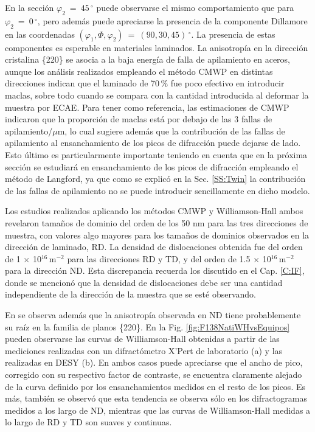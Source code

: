 En la sección $\varphi_2 \ = \ 45$\,$^{\circ}$ puede observarse el mismo comportamiento que para $\varphi_2 \ = \ 0$\,$^{\circ}$, pero además puede apreciarse la presencia de la componente Dillamore en las coordenadas $(\varphi_1, \Phi, \varphi_2) \ = \ (90, 30, 45)$\,$^{\circ}$.
La presencia de estas componentes es esperable en materiales laminados.
La anisotropía en la dirección cristalina \{220\} se asocia a la baja energía de falla de apilamiento en aceros\cite{Sathiaraj2015,Saleh2012}, aunque los análisis realizados empleando el método CMWP en distintas direcciones indican que el laminado de 70\,\% fue poco efectivo en introducir maclas, sobre todo cuando se compara con la cantidad introducida al deformar la muestra por ECAE.
Para tener como referencia, las estimaciones de CMWP indicaron que la proporción de maclas está por debajo de las 3 fallas de apilamiento/$\mu$m, lo cual sugiere además que la contribución de las fallas de apilamiento al ensanchamiento de los picos de difracción puede dejarse de lado.
Esto último es particularmente importante teniendo en cuenta que en la próxima sección se estudiará en ensanchamiento de los picos de difracción empleando el método de Langford, ya que como se explicó en la Sec. \ref{SS:Twin} la contribución de las fallas de apilamiento no se puede introducir sencillamente en dicho modelo.

Los estudios realizados aplicando los métodos CMWP y Williamson-Hall ambos revelaron tamaños de dominio del orden de los 50 nm para las tres direcciones de muestra, con valores algo mayores para los tamaños de dominios observados en la dirección de laminado, RD.
La densidad de dislocaciones obtenida fue del orden de 1 $\times$ 10$^{16}$\,m$^{-2}$ para las direcciones RD y TD, y del orden de 1.5 $\times$ 10$^{16}$\,m$^{-2}$ para la dirección ND.
Esta discrepancia recuerda los discutido en el Cap. \ref{C:IF}, donde se mencionó que la densidad de dislocaciones debe ser una cantidad independiente de la dirección de la muestra que se esté observando.

En \cite{Devincentis2017} se observa además que la anisotropía observada en ND tiene probablemente su raíz en la familia de planos \{220\}.
En la Fig. \ref{fig:F138NatiWHvsEquipos} pueden observarse las curvas de Williamson-Hall obtenidas a partir de las mediciones realizadas con un difractómetro X'Pert de laboratorio (a)  y las realizadas en DESY (b).
En ambos casos puede apreciarse que el ancho de pico, corregido con su respectivo factor de contraste, se encuentra claramente alejado de la curva definido por los ensanchamientos medidos en el resto de los picos.
Es más, también se observó que esta tendencia se observa sólo en los difractogramas medidos a los largo de ND, mientras que las curvas de Williamson-Hall medidas a lo largo de RD y TD son suaves y continuas.

